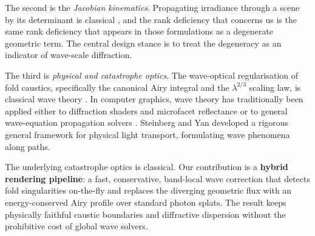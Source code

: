 The second is the \emph{Jacobian kinematics}. Propagating irradiance through a scene by its
determinant is classical \cite{arvo1994}, and the rank deficiency that concerns
us is the same rank deficiency that appears in those formulations as a
degenerate geometric term. The central design stance is to treat the degeneracy as an indicator of wave-scale diffraction.

The third is \emph{physical and catastrophe optics}. The wave-optical regularisation of
fold caustics, specifically the canonical Airy integral and the $\lambda^{2/3}$ scaling
law, is classical wave theory \cite{airy1838,berry1980,nye1999,kouyoumjian1974}. In computer graphics,
wave theory has traditionally been applied either to diffraction shaders and microfacet
reflectance \cite{stam1999,cuypers2012,yan2018} or to general wave-equation propagation
solvers \cite{musbach2013,steinberg2021}. Steinberg and Yan \cite{steinberg2021} developed
a rigorous general framework for physical light transport, formulating wave phenomena
along paths. 

The underlying catastrophe optics is classical.
Our contribution is a \textbf{hybrid rendering pipeline}: a fast, conservative, band-local wave correction that
detects fold singularities on-the-fly and replaces the diverging geometric flux with
an energy-conserved Airy profile over standard photon splats. The result keeps physically
faithful caustic boundaries and diffractive dispersion without the prohibitive cost of
global wave solvers.
